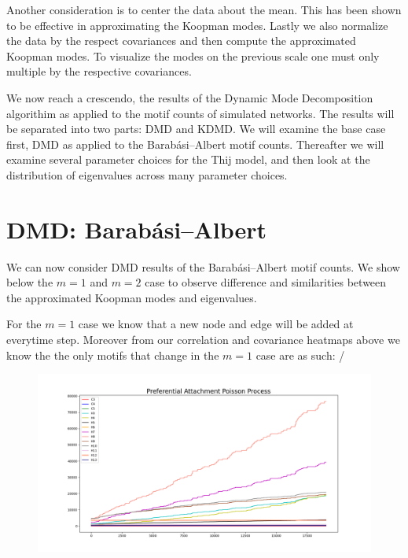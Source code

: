 \vspace{3mm}

Another consideration is to center the data about the mean. This has been shown to be effective in
approximating the Koopman modes. Lastly we also normalize the data by the respect covariances 
and then compute the approximated Koopman modes. To visualize the modes on the previous scale 
one must only multiple by the respective covariances. 



We now reach a crescendo, the results of the Dynamic Mode Decomposition algorithim as applied to the
motif counts of simulated networks. The results will be separated into two parts: DMD and KDMD. We will examine the base case first, DMD as applied to the 
Barabási–Albert motif counts. Thereafter we will examine several parameter choices for the Thij model,
and then look at the distribution of eigenvalues across many parameter choices.


\section{DMD: Barabási–Albert}

We can now consider DMD results of the Barabási–Albert motif counts. We show below
the $m=1$ and $m=2$ case to observe difference and similarities between the approximated 
Koopman modes and eigenvalues. 

For the $m=1$ case we know that a new node and edge will be added at everytime step. Moreover from our
correlation and covariance heatmaps above we know the the only motifs that change in the $m=1$ case 
are as such: / 

\newpage

\begin{figure}
    \includegraphics[width=12cm]{Images/poissonprocess_pref_attach_1.png}
    \centering
\end{figure}

